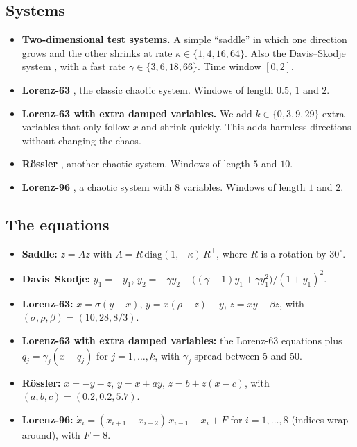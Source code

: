 \documentclass[11pt,a4paper]{article}
\begin{document}
\subsection{Systems}
\begin{itemize}
\item \textbf{Two-dimensional test systems.} A simple ``saddle'' in which one direction grows
  and the other shrinks at rate $\kappa\in\{1,4,16,64\}$. Also the Davis--Skodje system
  \cite{davis1999}, with a fast rate $\gamma\in\{3,6,18,66\}$. Time window $[0,2]$.
\item \textbf{Lorenz-63} \cite{lorenz1963}, the classic chaotic system. Windows of length
  $0.5$, $1$ and $2$.
\item \textbf{Lorenz-63 with extra damped variables.} We add $k\in\{0,3,9,29\}$ extra
  variables that only follow $x$ and shrink quickly. This adds harmless directions without
  changing the chaos.
\item \textbf{Rössler} \cite{rossler1976}, another chaotic system. Windows of length $5$ and
  $10$.
\item \textbf{Lorenz-96} \cite{lorenz1996}, a chaotic system with 8 variables. Windows of
  length $1$ and $2$.
\end{itemize}

\subsection{The equations}
\begin{itemize}
\item \textbf{Saddle:} $\dot z = A z$ with $A = R\,\mathrm{diag}(1,-\kappa)\,R^{\top}$, where
  $R$ is a rotation by $30^\circ$.
\item \textbf{Davis--Skodje:} $\dot y_1=-y_1$,
  $\dot y_2=-\gamma y_2+\big((\gamma-1)y_1+\gamma y_1^2\big)/(1+y_1)^2$.
\item \textbf{Lorenz-63:} $\dot x=\sigma(y-x)$, $\dot y=x(\rho-z)-y$, $\dot z=xy-\beta z$,
  with $(\sigma,\rho,\beta)=(10,28,8/3)$.
\item \textbf{Lorenz-63 with extra damped variables:} the Lorenz-63 equations plus
  $\dot q_j=\gamma_j(x-q_j)$ for $j=1,\dots,k$, with $\gamma_j$ spread between 5 and 50.
\item \textbf{Rössler:} $\dot x=-y-z$, $\dot y=x+ay$, $\dot z=b+z(x-c)$, with
  $(a,b,c)=(0.2,0.2,5.7)$.
\item \textbf{Lorenz-96:} $\dot x_i=(x_{i+1}-x_{i-2})\,x_{i-1}-x_i+F$ for $i=1,\dots,8$
  (indices wrap around), with $F=8$.
\end{itemize}
\end{document}
